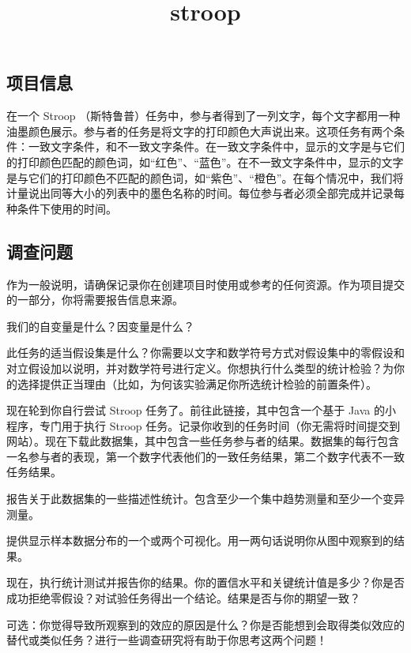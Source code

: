 \documentclass[11pt]{article}
\title{stroop}
\begin{document}
    
    
    \maketitle
    
    

    
    \subsection{项目信息}\label{ux9879ux76eeux4fe1ux606f}

在一个 Stroop
（斯特鲁普）任务中，参与者得到了一列文字，每个文字都用一种油墨颜色展示。参与者的任务是将文字的打印颜色大声说出来。这项任务有两个条件：一致文字条件，和不一致文字条件。在一致文字条件中，显示的文字是与它们的打印颜色匹配的颜色词，如``红色''、``蓝色''。在不一致文字条件中，显示的文字是与它们的打印颜色不匹配的颜色词，如``紫色''、``橙色''。在每个情况中，我们将计量说出同等大小的列表中的墨色名称的时间。每位参与者必须全部完成并记录每种条件下使用的时间。

\subsection{调查问题}\label{ux8c03ux67e5ux95eeux9898}

作为一般说明，请确保记录你在创建项目时使用或参考的任何资源。作为项目提交的一部分，你将需要报告信息来源。

我们的自变量是什么？因变量是什么？

此任务的适当假设集是什么？你需要以文字和数学符号方式对假设集中的零假设和对立假设加以说明，并对数学符号进行定义。你想执行什么类型的统计检验？为你的选择提供正当理由（比如，为何该实验满足你所选统计检验的前置条件）。

现在轮到你自行尝试 Stroop 任务了。前往此链接，其中包含一个基于 Java
的小程序，专门用于执行 Stroop
任务。记录你收到的任务时间（你无需将时间提交到网站）。现在下载此数据集，其中包含一些任务参与者的结果。数据集的每行包含一名参与者的表现，第一个数字代表他们的一致任务结果，第二个数字代表不一致任务结果。

报告关于此数据集的一些描述性统计。包含至少一个集中趋势测量和至少一个变异测量。

提供显示样本数据分布的一个或两个可视化。用一两句话说明你从图中观察到的结果。

现在，执行统计测试并报告你的结果。你的置信水平和关键统计值是多少？你是否成功拒绝零假设？对试验任务得出一个结论。结果是否与你的期望一致？

可选：你觉得导致所观察到的效应的原因是什么？你是否能想到会取得类似效应的替代或类似任务？进行一些调查研究将有助于你思考这两个问题！
\end{document}
